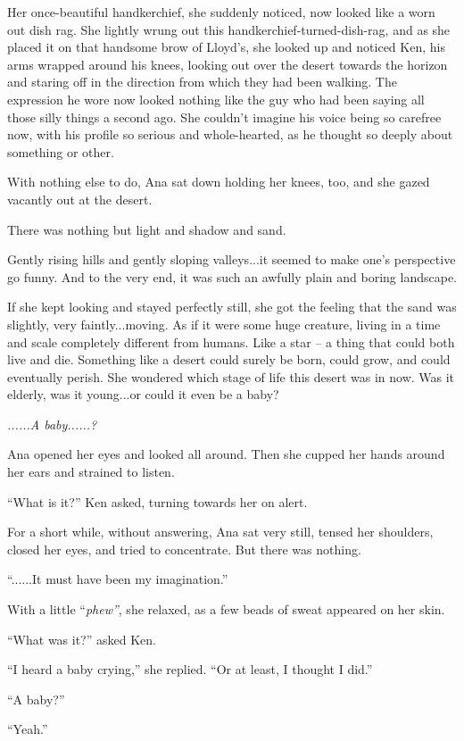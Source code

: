 \documentclass[
]{article}
\begin{document}
Her once-beautiful handkerchief, she suddenly noticed, now looked like a
worn out dish rag. She lightly wrung out this
handkerchief-turned-dish-rag, and as she placed it on that handsome brow
of Lloyd's, she looked up and noticed Ken, his arms wrapped around his
knees, looking out over the desert towards the horizon and staring off
in the direction from which they had been walking. The expression he
wore now looked nothing like the guy who had been saying all those silly
things a second ago. She couldn't imagine his voice being so carefree
now, with his profile so serious and whole-hearted, as he thought so
deeply about something or other.

With nothing else to do, Ana sat down holding her knees, too, and she
gazed vacantly out at the desert.

There was nothing but light and shadow and sand.

Gently rising hills and gently sloping valleys...it seemed to make one's
perspective go funny. And to the very end, it was such an awfully plain
and boring landscape.

If she kept looking and stayed perfectly still, she got the feeling that
the sand was slightly, very faintly...moving. As if it were some huge
creature, living in a time and scale completely different from humans.
Like a star -- a thing that could both live and die. Something like a
desert could surely be born, could grow, and could eventually perish.
She wondered which stage of life this desert was in now. Was it elderly,
was it young...or could it even be a baby?

\emph{......A baby......?}

Ana opened her eyes and looked all around. Then she cupped her hands
around her ears and strained to listen.

``What is it?'' Ken asked, turning towards her on alert.

For a short while, without answering, Ana sat very still, tensed her
shoulders, closed her eyes, and tried to concentrate. But there was
nothing.

``......It must have been my imagination.''

With a little ``\emph{phew''}, she relaxed, as a few beads of sweat
appeared on her skin.

``What was it?'' asked Ken.

``I heard a baby crying,'' she replied. ``Or at least, I thought I
did.''

``A baby?''

``Yeah.''
\end{document}
